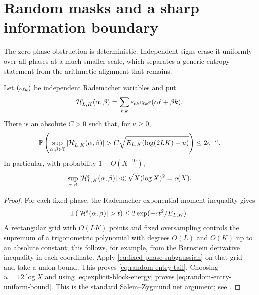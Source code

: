 \section{Random masks and a sharp information boundary}
\label{sec:sharp-boundary}

The zero-phase obstruction is deterministic.  Independent signs erase
it uniformly over all phases at a much smaller scale, which separates a
generic entropy statement from the arithmetic alignment that remains.

\begin{theorem}
\label{thm:random-entry-cancellation}
Let $(\varepsilon_{\ell k})$ be independent Rademacher variables and put
\begin{equation}
 \mathcal H^\varepsilon_{L,K}(\alpha,\beta)
 =\sum_{\ell,k}\varepsilon_{\ell k}c_{\ell k}
 \mathrm e(\alpha\ell+\beta k).
 \label{eq:random-entry-polynomial}
\end{equation}
There is an absolute $C>0$ such that, for $u\ge0$,
\begin{equation}
 \mathbb P\left(
 \sup_{\alpha,\beta\in\mathbb T}|\mathcal H^\varepsilon_{L,K}(\alpha,\beta)|
 >C\sqrt{E_{L,K}(\log(2LK)+u)}
 \right)\le 2e^{-u}.
 \label{eq:random-entry-tail}
\end{equation}
In particular, with probability $1-O(X^{-10})$,
\begin{equation}
 \sup_{\alpha,\beta}|\mathcal H^\varepsilon_{L,K}(\alpha,\beta)|
 \ll\sqrt X(\log X)^2=o(X).
 \label{eq:random-entry-uniform-bound}
\end{equation}
\end{theorem}

\begin{proof}
For each fixed phase, the Rademacher exponential-moment inequality gives
\begin{equation}
 \mathbb P(|\cH^\eps(\alpha,\beta)|>t)
 \le2\exp(-c t^2/E_{L,K}).
 \label{eq:fixed-phase-subgaussian}
\end{equation}
A rectangular grid with $O(LK)$ points and fixed oversampling controls
the supremum of a trigonometric polynomial with degrees $O(L)$ and
$O(K)$ up to an absolute constant; this follows, for example, from the
Bernstein derivative inequality in each coordinate.  Apply
\eqref{eq:fixed-phase-subgaussian} on that grid and take a union bound.
This proves \eqref{eq:random-entry-tail}.  Choosing $u=12\log X$ and
using \eqref{eq:explicit-block-energy} proves
\eqref{eq:random-entry-uniform-bound}.  This is the standard
Salem--Zygmund net argument; see \citet{Kahane1985,Zygmund2002}.
\end{proof}


